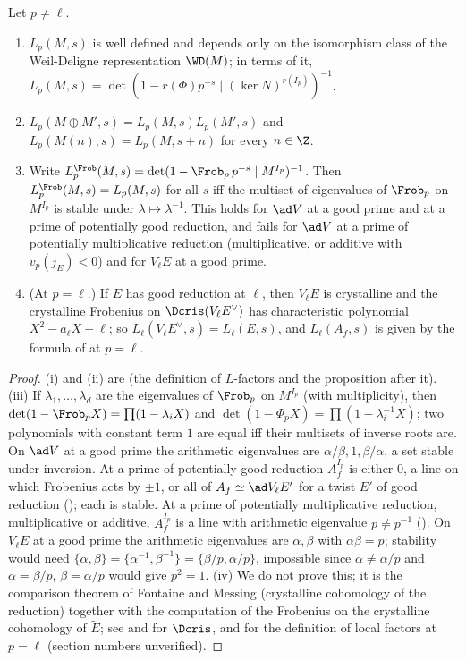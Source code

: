 \begin{proposition}\label{prop:lfunctions:local-factor}
Let $p\ne\ell$.
\begin{enumerate}[label=(\roman*)]
\item $L_p(M,s)$ is well defined and depends only on the isomorphism class of the Weil-Deligne representation $\WD(M)$; in terms of it,
$L_p(M,s)=\det(1-r(\Phi)p^{-s}\mid(\ker N)^{r(I_p)})^{-1}$.
\item $L_p(M\oplus M',s)=L_p(M,s)L_p(M',s)$ and $L_p(M(n),s)=L_p(M,s+n)$ for every $n\in\Z$.
\item Write $L_p^{\Frob}(M,s)=\det(1-\Frob_p\,p^{-s}\mid M^{I_p})^{-1}$. Then $L_p^{\Frob}(M,s)=L_p(M,s)$ for all $s$ iff the multiset of eigenvalues of $\Frob_p$ on $M^{I_p}$ is
stable under $\lambda\mapsto\lambda^{-1}$. This holds for $\ad V$ at a good prime and at a prime of potentially good reduction, and fails for $\ad V$ at a
prime of potentially multiplicative reduction (multiplicative, or additive with $v_p(j_E)<0$) and for $V_\ell E$ at a good prime.
\item (At $p=\ell$.) If $E$ has good reduction at $\ell$, then $V_\ell E$ is crystalline and the crystalline Frobenius on $\Dcris(V_\ell E^\vee)$ has characteristic polynomial
$X^2-a_\ell X+\ell$; so $L_\ell(V_\ell E^\vee,s)=L_\ell(E,s)$, and $L_\ell(A_f,s)$ is given by the formula of  at $p=\ell$.
\end{enumerate}
\end{proposition}

\begin{proof}
(i) and (ii) are  (the definition of $L$-factors and the proposition after it). (iii) If $\lambda_1,\dots,\lambda_d$ are the eigenvalues of $\Frob_p$ on $M^{I_p}$
(with multiplicity), then $\det(1-\Frob_pX)=\prod(1-\lambda_iX)$ and $\det(1-\Phi_pX)=\prod(1-\lambda_i^{-1}X)$; two polynomials with constant term $1$ are equal iff their
multisets of inverse roots are. On $\ad V$ at a good prime the arithmetic eigenvalues are $\alpha/\beta,1,\beta/\alpha$, a set stable under inversion. At a prime of potentially
good reduction $A_f^{I_p}$ is either $0$, a line on which Frobenius acts by $\pm1$, or all of $A_f\simeq\ad V_\ell E'$ for a twist $E'$ of good reduction
(); each is stable. At a prime of potentially multiplicative reduction, multiplicative or additive, $A_f^{I_p}$ is a line with arithmetic eigenvalue $p\ne p^{-1}$
(). On $V_\ell E$ at a good prime the arithmetic eigenvalues are $\alpha,\beta$ with $\alpha\beta=p$; stability would need
$\{\alpha,\beta\}=\{\alpha^{-1},\beta^{-1}\}=\{\beta/p,\alpha/p\}$, impossible since $\alpha\ne\alpha/p$ and $\alpha=\beta/p$, $\beta=\alpha/p$ would give $p^2=1$.
(iv) We do not prove this; it is the comparison theorem of Fontaine and Messing (crystalline cohomology of the reduction) together with the computation of the
Frobenius on the crystalline cohomology of $\tilde E$; see \cite{Fontaine} and \cite{Berger} for $\Dcris$, and \cite[Section 4]{Tate79} for the definition of local
factors at $p=\ell$ (section numbers unverified).
\end{proof}

